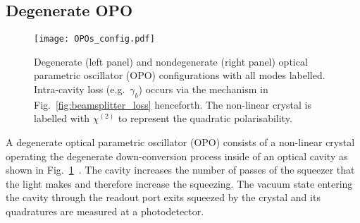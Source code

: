 \subsection{Degenerate OPO}

\begin{figure}
	\centering
	\texttt{[image: OPOs\_config.pdf]}
	\caption{ Degenerate (left panel) and nondegenerate (right panel) optical parametric oscillator (OPO) configurations with all modes labelled. Intra-cavity loss (e.g.\ $\gamma_b$) occurs via the mechanism in Fig.~\ref{fig:beamsplitter_loss} henceforth. The non-linear crystal is labelled with $\chi^{(2)}$ to represent the quadratic polarisability. %
	}
	\label{fig:OPOs_config}
\end{figure}

A degenerate optical parametric oscillator (OPO) consists of a non-linear crystal operating the degenerate down-conversion process inside of an optical cavity as shown in Fig.~\ref{fig:OPOs_config}~\cite{}. The cavity increases the number of passes of the squeezer that the light makes and therefore increase the squeezing. The vacuum state entering the cavity through the readout port exits squeezed by the crystal and its quadratures are measured at a photodetector.


